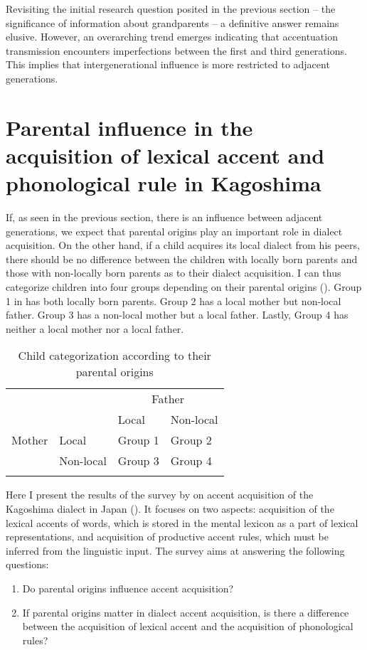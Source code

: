 \documentclass[output=paper,colorlinks,citecolor=brown]{langscibook}
\begin{document}
Revisiting the initial research question posited in the previous section -- the significance of information about grandparents -- a definitive answer remains elusive. However, an overarching trend emerges indicating that accentuation transmission encounters imperfections between the first and third generations. This implies that intergenerational influence is more restricted to adjacent generations.

\section{Parental influence in the acquisition of lexical accent and phonological rule in Kagoshima}\label{sec:kagoshima}

If, as seen in the previous section, there is an influence between adjacent generations, we expect that parental origins play an important role in dialect acquisition. On the other hand, if a child acquires its local dialect from his peers, there should be no difference between the children with locally born parents and those with non-locally born parents as to their dialect acquisition. I can thus categorize children into four groups depending on their parental origins (). Group 1 in  has both locally born parents. Group 2 has a local mother but non-local father. Group 3 has a non-local mother but a local father. Lastly, Group 4 has neither a local mother nor a local father. 

\begin{table}
\centering
\caption{Child categorization according to their parental origins}
\label{tab:categ}
\begin{tabular}{llll}
\lsptoprule
& & \multicolumn{2}{c}{Father} \\\cmidrule(lr){3-4}
& & Local & Non-local \\ \midrule
Mother & Local & Group 1 & Group 2 \\
       & Non-local & Group 3 & Group 4 \\
\lspbottomrule
\end{tabular}
\end{table}

Here I present the results of the survey by \citet{Takemura2012} on accent acquisition of the Kagoshima dialect in Japan (). It focuses on two aspects: acquisition of the lexical accents of words, which is stored in the mental lexicon as a part of lexical representations, and acquisition of productive accent rules, which must be inferred from the linguistic input. The survey aims at answering the following questions:
\begin{enumerate}
  \item Do parental origins influence accent acquisition?
  \item If parental origins matter in dialect accent acquisition, is there a difference between the acquisition of lexical accent and the acquisition of phonological rules?
\end{enumerate}
\end{document}
